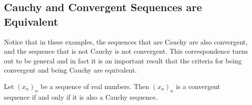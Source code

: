 \documentclass[../real_analysis.tex]{subfiles}
\begin{document}
        \subsection{Cauchy and Convergent Sequences are Equivalent}\label{subsec:cauchy-and-convergent-sequences-are-equivalent}
            Notice that in these examples, the sequences that are Cauchy are also convergent, and the sequence that is not Cauchy is not convergent. This correspondence turns out to be general and in fact it is an important result that the criteria for being convergent and being Cauchy are equivalent.
            \begin{theorem}
                Let $(x_n)_n$ be a sequence of real numbers. Then $(x_n)_n$ is a convergent sequence if and only if it is also a Cauchy sequence.
            \end{theorem}
\end{document}
